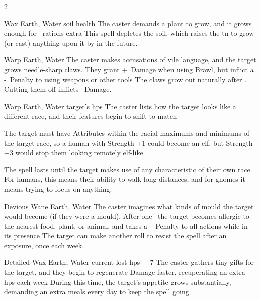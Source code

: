 \begin{multicols}{2}
{  %
    {}%
    {Wax}%
    {Earth, Water}%
    {soil health}%
    {The caster demands a plant to grow, and it grows enough for ~\glspl{ration} extra}%
    {
    This \gls{spell} depletes the soil, which raises the \gls{tn} to grow (or cast) anything upon it by  in the future.}

    {}%
    {Warp}%
    {Earth, Water}%
    {}%
    {The caster makes accusations of vile language, and the target grows needle-sharp claws.
    They grant +~Damage when using Brawl, but inflict a -~Penalty to using weapons or other tools}%
    {
    The claws grow out naturally after .
    Cutting them off inflicts ~Damage.}

    {}%
    {Warp}%
    {Earth, Water}%
    {target's \glspl{hp}}%
    {The caster lists how the target looks like a different race, and their features begin to shift to match}%
    {The target must have Attributes within the racial maximums and minimums of the target race, so a human with Strength +1 could become an elf, but Strength +3 would stop them looking remotely elf-like.

    The spell lasts until the target makes use of any characteristic of their own race.
    For humans, this means their ability to walk long-distances, and for gnomes it means trying to focus on anything.}

    {Devious}%
    {Wane}%
    {Earth, Water}%
    {}%
    {The caster imagines what kinds of mould the target would become (if they were a mould).
    After one \showOnset\ the target becomes allergic to the nearest food, plant, or animal, and takes a -~Penalty to all actions while in its presence}%
    {
    The target can make another roll to resist the \gls{spell} after an exposure, once each week.}

    {Detailed}%
    {Wax}%
    {Earth, Water}%
    {current lost \glspl{hp} + 7}%
    {The caster gathers tiny gifts for the target, and they begin to regenerate Damage faster, recuperating an extra  \glspl{hp} each week}%
    {During this time, the target's appetite grows substantially, demanding an extra  meals every day to keep the spell going.}

}
\end{multicols}
